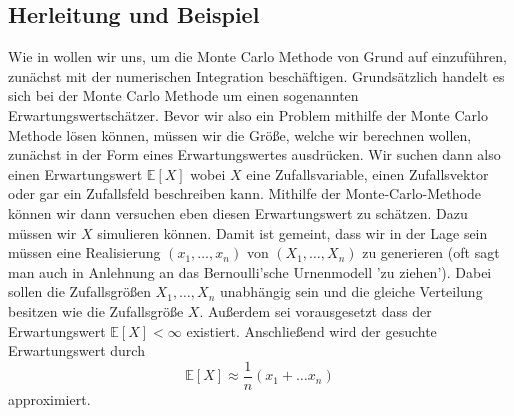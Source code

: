 \subsection{Herleitung und Beispiel}
Wie in \cite{lapeyre2003introduction} wollen wir uns, um die Monte Carlo Methode von Grund auf einzuführen, zunächst mit der numerischen Integration beschäftigen. Grundsätzlich handelt es sich bei der Monte Carlo Methode um einen sogenannten Erwartungswertschätzer. Bevor wir also ein Problem mithilfe der Monte Carlo Methode lösen können, müssen wir die Größe, welche wir berechnen wollen, zunächst in der Form eines Erwartungswertes ausdrücken.
Wir suchen dann also einen Erwartungswert $ \mathbb{E}[X] $ wobei $ X $ eine Zufallsvariable, einen Zufallsvektor oder gar ein Zufallsfeld beschreiben kann.
Mithilfe der Monte-Carlo-Methode können wir dann versuchen eben diesen Erwartungswert zu schätzen. Dazu müssen wir $ X $ simulieren können. Damit ist gemeint, dass wir in der Lage sein müssen eine Realisierung $ (x_1,\dots,x_n) $ von $ (X_1,\dots,X_n) $ zu generieren (oft sagt man auch in Anlehnung an das Bernoulli'sche Urnenmodell 'zu ziehen'). Dabei sollen die Zufallsgrößen $ X_1,\dots,X_n $ unabhängig sein und die gleiche Verteilung besitzen wie die Zufallsgröße $ X $. Außerdem sei vorausgesetzt dass der Erwartungswert $ \mathbb{E}[X] < \infty $ existiert.
Anschließend wird der gesuchte Erwartungswert durch
\[
	\mathbb{E}[X] \approx \frac{1}{n}(x_1 + \dots x_n)
\]
approximiert.


